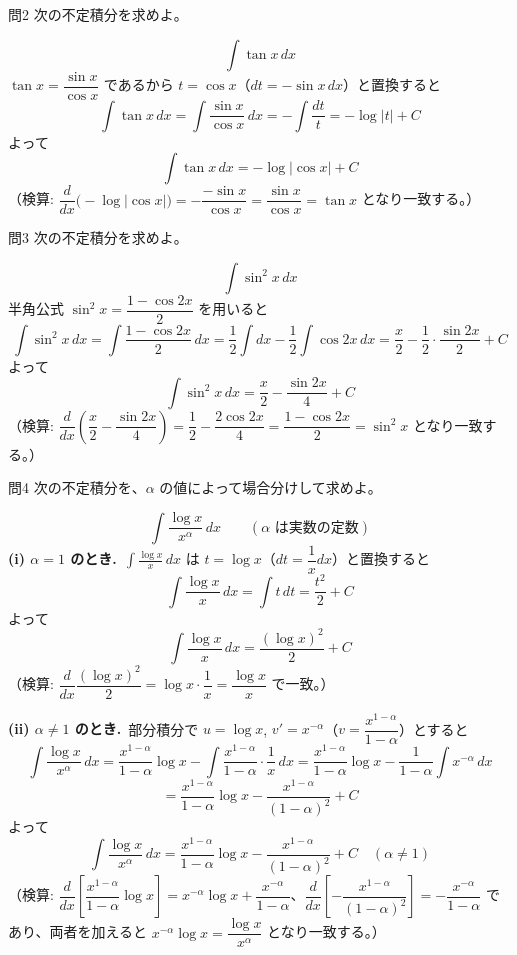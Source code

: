 \documentclass[a4paper,11pt]{article}
\begin{document}
\clearpage
\begin{mondaiboxS}{問2}
次の不定積分を求めよ。
\end{mondaiboxS}
\[
\int \tan x \, dx
\]
\kaitou
$\tan x = \dfrac{\sin x}{\cos x}$ であるから $t = \cos x$（$dt = -\sin x \, dx$）と置換すると
\[
\int \tan x \, dx = \int \frac{\sin x}{\cos x}\, dx = -\int \frac{dt}{t} = -\log|t| + C
\]
よって
\[
\boxed{\; \int \tan x \, dx = -\log|\cos x| + C \;}
\]
（検算: $\dfrac{d}{dx}\bigl(-\log|\cos x|\bigr) = -\dfrac{-\sin x}{\cos x} = \dfrac{\sin x}{\cos x} = \tan x$ となり一致する。）

\clearpage
\begin{mondaiboxS}{問3}
次の不定積分を求めよ。
\end{mondaiboxS}
\[
\int \sin^{2} x \, dx
\]
\kaitou
半角公式 $\sin^{2} x = \dfrac{1-\cos 2x}{2}$ を用いると
\[
\int \sin^{2} x \, dx = \int \frac{1-\cos 2x}{2}\, dx = \frac{1}{2}\int dx - \frac{1}{2}\int \cos 2x \, dx = \frac{x}{2} - \frac{1}{2}\cdot\frac{\sin 2x}{2} + C
\]
よって
\[
\boxed{\; \int \sin^{2} x \, dx = \frac{x}{2} - \frac{\sin 2x}{4} + C \;}
\]
（検算: $\dfrac{d}{dx}\left(\dfrac{x}{2} - \dfrac{\sin 2x}{4}\right) = \dfrac{1}{2} - \dfrac{2\cos 2x}{4} = \dfrac{1-\cos 2x}{2} = \sin^{2}x$ となり一致する。）

\clearpage
\begin{mondaiboxS}{問4}
次の不定積分を、$\alpha$ の値によって場合分けして求めよ。
\end{mondaiboxS}
\[
\int \frac{\log x}{x^{\alpha}} \, dx \qquad (\alpha \text{ は実数の定数})
\]
\kaitou
\textbf{(i) $\alpha = 1$ のとき.}\ $\displaystyle\int \frac{\log x}{x}\, dx$ は $t = \log x$（$dt = \dfrac{1}{x}dx$）と置換すると
\[
\int \frac{\log x}{x}\, dx = \int t \, dt = \frac{t^{2}}{2} + C
\]
よって
\[
\boxed{\; \int \frac{\log x}{x}\, dx = \frac{(\log x)^{2}}{2} + C \;}
\]
（検算: $\dfrac{d}{dx}\dfrac{(\log x)^{2}}{2} = \log x \cdot \dfrac{1}{x} = \dfrac{\log x}{x}$ で一致。）

\noindent
\textbf{(ii) $\alpha \neq 1$ のとき.}\ 部分積分で $u = \log x$, $v' = x^{-\alpha}$（$v = \dfrac{x^{1-\alpha}}{1-\alpha}$）とすると
\[
\int \frac{\log x}{x^{\alpha}}\, dx
= \frac{x^{1-\alpha}}{1-\alpha}\log x - \int \frac{x^{1-\alpha}}{1-\alpha}\cdot \frac{1}{x}\, dx
= \frac{x^{1-\alpha}}{1-\alpha}\log x - \frac{1}{1-\alpha}\int x^{-\alpha}\, dx
\]
\[
= \frac{x^{1-\alpha}}{1-\alpha}\log x - \frac{x^{1-\alpha}}{(1-\alpha)^{2}} + C
\]
よって
\[
\boxed{\; \int \frac{\log x}{x^{\alpha}}\, dx = \frac{x^{1-\alpha}}{1-\alpha}\log x - \frac{x^{1-\alpha}}{(1-\alpha)^{2}} + C \quad (\alpha \neq 1) \;}
\]
（検算: $\dfrac{d}{dx}\left[\dfrac{x^{1-\alpha}}{1-\alpha}\log x\right] = x^{-\alpha}\log x + \dfrac{x^{-\alpha}}{1-\alpha}$、$\dfrac{d}{dx}\left[-\dfrac{x^{1-\alpha}}{(1-\alpha)^{2}}\right] = -\dfrac{x^{-\alpha}}{1-\alpha}$ であり、両者を加えると $x^{-\alpha}\log x = \dfrac{\log x}{x^{\alpha}}$ となり一致する。）
\end{document}
